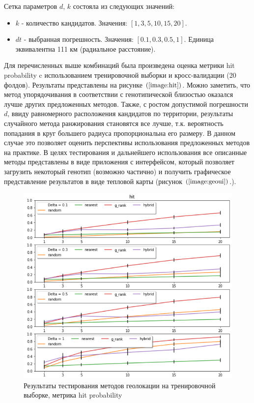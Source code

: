 Сетка параметров $d$, $k$ состояла из следующих значений:
\begin{itemize}

\item $k$ - количество кандидатов. Значения: $[1, 3, 5, 10, 15, 20].$

\item $dt$ - выбранная погрешность. Значения: $[0.1, 0.3, 0.5, 1].$ Единица эквивалентна 111 км (радиальное расстояние).

\end{itemize}

Для перечисленных выше комбинаций была произведена оценка метрики hit probability
c использованием тренировочной выборки и кросс-валидации (20 фолдов). Результаты представлены на рисунке $\left(\ref{image:hit}\right)$.
Можно заметить, что метод упорядочивания в соответствии с генотипической близостью оказался лучше других предложенных методов. Также,
с ростом допустимой погрешности $d$, ввиду равномерного расположения кандидатов по территории, результаты случайного метода ранжирования становятся все лучше,
т.к. вероятность попадания в круг большего радиуса пропорциональна его размеру.
В данном случае это позволяет оценить перспективы использования предложенных методов на практике.
В целях тестирования и дальнейшего использования все описанные методы представлены в виде приложения с
 интерфейсом, который позволяет загрузить некоторый генотип (возможно частично)
и получить графическое представление результатов в виде тепловой карты (рисунок $\left(\ref{image:geoui}\right)$.).

\begin{figure}[h]
\begin{center}
\includegraphics[width=14cm]{images/hit.png}
\end{center}
  \caption{Результаты тестирования методов геолокации на тренировочной выборке, метрика hit probability}
  \label{image:hit}
\end{figure}

